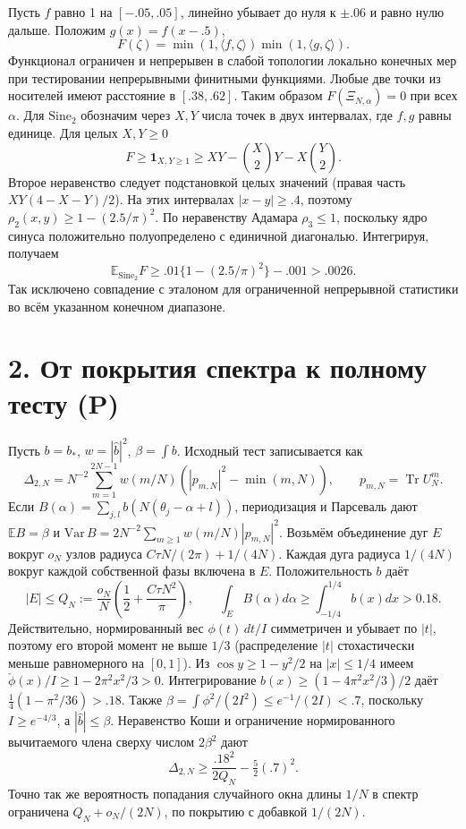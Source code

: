 \documentclass[11pt,a4paper]{article}
\newcommand{\Tr}{\operatorname{Tr}}
\newcommand{\EE}{\mathbb E}
\newcommand{\si}{\mathrm{Sine}_2}
\newcommand{\sect}[1]{\section*{\sffamily\color{ink}#1}}
\begin{document}
Пусть $f$ равно 1 на $[-.05,.05]$, линейно убывает до нуля к $\pm.06$ и равно нулю дальше. Положим $g(x)=f(x-.5)$,
\[
 F(\zeta)=\min(1,\langle f,\zeta\rangle)\min(1,\langle g,\zeta\rangle).
\]
Функционал ограничен и непрерывен в слабой топологии локально конечных мер при тестировании непрерывными финитными функциями. Любые две точки из носителей имеют расстояние в $[.38,.62]$. Таким образом $F(\Xi_{N,\alpha})=0$ при всех $\alpha$. Для $\si$ обозначим через $X,Y$ числа точек в двух интервалах, где $f,g$ равны единице. Для целых $X,Y\ge0$
\[
 F\ge\mathbf1_{X,Y\ge1}\ge XY-\binom X2Y-X\binom Y2 .
\]
Второе неравенство следует подстановкой целых значений (правая часть $XY(4-X-Y)/2$). На этих интервалах $|x-y|\ge.4$, поэтому $\rho_2(x,y)\ge1-(2.5/\pi)^2$. По неравенству Адамара $\rho_3\le1$, поскольку ядро синуса положительно полуопределено с единичной диагональю. Интегрируя, получаем
\[
                 \EE_{\si} F\ge.01\{1-(2.5/\pi)^2\}-.001>.0026 .
\]
Так исключено совпадение с эталоном для ограниченной непрерывной статистики во всём указанном конечном диапазоне.
\newpage
\sect{2. От покрытия спектра к полному тесту (P)}
Пусть $b=b_*$, $w=|\widehat b|^2$, $\beta=\int b$. Исходный тест записывается как
\[
 \Delta_{2,N}=N^{-2}\sum_{m=1}^{2N-1}w(m/N)(|p_{m,N}|^2-\min(m,N)),
 \qquad p_{m,N}=\Tr U_N^m.
\]
Если $B(\alpha)=\sum_{j,l}b(N(\theta_j-\alpha+l))$, периодизация и Парсеваль дают $\EE B=\beta$ и $\mathrm{Var}\, B=2N^{-2}\sum_{m\ge1}w(m/N)|p_{m,N}|^2$. Возьмём объединение дуг $E$ вокруг $o_N$ узлов радиуса $C\tau N/(2\pi)+1/(4N)$. Каждая дуга радиуса $1/(4N)$ вокруг каждой собственной фазы включена в $E$. Положительность $b$ даёт
\[
 |E|\le Q_N:=\frac{o_N}{N}\left(\frac12+\frac{C\tau N^2}{\pi}\right),
 \qquad \int_E B(\alpha)d\alpha\ge\int_{-1/4}^{1/4}b(x)dx>0.18 .
\]
Действительно, нормированный вес $\phi(t)\,dt/I$ симметричен и убывает по $|t|$, поэтому его второй момент не выше $1/3$ (распределение $|t|$ стохастически меньше равномерного на $[0,1]$). Из $\cos y\ge1-y^2/2$ на $|x|\le1/4$ имеем $\check\phi(x)/I\ge1-2\pi^2x^2/3>0$. Интегрирование $b(x)\ge(1-4\pi^2x^2/3)/2$ даёт $\frac14(1-\pi^2/36)>.18$. Также $\beta=\int\phi^2/(2I^2)\le e^{-1}/(2I)<.7$, поскольку $I\ge e^{-4/3}$, а $|\widehat b|\le\beta$. Неравенство Коши и ограничение нормированного вычитаемого члена сверху числом $2\beta^2$ дают
\[
 \boxed{\displaystyle\Delta_{2,N}\ge\frac{.18^2}{2Q_N}-\tfrac52(.7)^2.} \tag{1}
\]
Точно так же вероятность попадания случайного окна длины $1/N$ в спектр ограничена $Q_N+o_N/(2N)$, по покрытию с добавкой $1/(2N)$.
\end{document}
